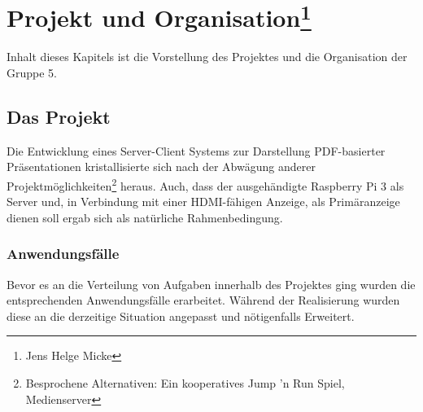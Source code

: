 \chapter[Projekt und Organisation]{Projekt und Organisation\footnote{Jens Helge Micke}}
\thispagestyle{fancy}
\label{ProjektOrganisation}
Inhalt dieses Kapitels ist die Vorstellung des Projektes und die Organisation der Gruppe 5.
\section{Das Projekt}
\label{DasProjekt}
Die Entwicklung eines Server-Client Systems zur Darstellung PDF-basierter Präsentationen kristallisierte sich nach der Abwägung anderer Projektmöglichkeiten\footnote{Besprochene Alternativen: Ein kooperatives Jump 'n Run Spiel, Medienserver} heraus.
Auch, dass der ausgehändigte \glqq Raspberry Pi 3 \grqq als Server und, in Verbindung mit einer HDMI-fähigen Anzeige, als Primäranzeige dienen soll ergab sich als natürliche Rahmenbedingung.
\subsection{Anwendungsfälle}
\label{Anwendungsfälle}
Bevor es an die Verteilung von Aufgaben innerhalb des Projektes ging wurden die entsprechenden Anwendungsfälle erarbeitet.
Während der Realisierung wurden diese an die derzeitige Situation angepasst und nötigenfalls Erweitert.\\



